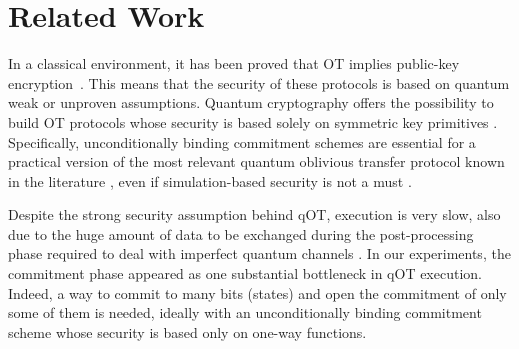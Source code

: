 \section{Related Work}
In a classical environment, it has been proved that OT implies public-key encryption~\cite{FOCS:GKMRV00}. 
This means that the security of these protocols is based on quantum weak or unproven assumptions. 
Quantum cryptography offers the possibility to build OT protocols whose security is based solely on symmetric key primitives \cite{santos_quantum_2022}.
Specifically, unconditionally binding commitment schemes are essential \cite{lemus2025performancepracticalquantumoblivious} for a practical version of the most relevant quantum oblivious transfer protocol known in the literature \cite{10.1007/3-540-46766-1_29}, even if simulation-based security is not a must \cite{scott_quantum_2002}.

Despite the strong security assumption behind qOT, execution is very slow, also due to the huge amount of data to be exchanged during the post-processing phase required to deal with imperfect quantum channels \cite{santos_private_2022}.
In our experiments, the commitment phase appeared as one substantial bottleneck in qOT execution.
Indeed, a way to commit to many bits (states) and open the commitment of only some of them is needed, ideally with an unconditionally binding commitment scheme whose security is based only on one-way functions.